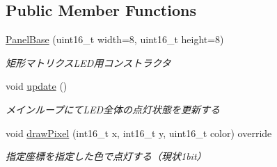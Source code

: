\subsection*{Public Member Functions}
\begin{DoxyCompactItemize}
\item 
\mbox{\label{classPanelBase_ae67aa479a006ead3f7ab01c6ce41e26b}} 
\hyperlink{classPanelBase_ae67aa479a006ead3f7ab01c6ce41e26b}{Panel\+Base} (uint16\+\_\+t width=8, uint16\+\_\+t height=8)
\begin{DoxyCompactList}\small\item\em 矩形マトリクス\+L\+E\+D用コンストラクタ \end{DoxyCompactList}\item 
\mbox{\label{classPanelBase_aece79bece96754da41945381d63a08fb}} 
void \hyperlink{classPanelBase_aece79bece96754da41945381d63a08fb}{update} ()
\begin{DoxyCompactList}\small\item\em メインループにて\+L\+E\+D全体の点灯状態を更新する \end{DoxyCompactList}\item 
\mbox{\label{classPanelBase_a45f3a84f68861b3ae1bb34056bfd0d12}} 
void \hyperlink{classPanelBase_a45f3a84f68861b3ae1bb34056bfd0d12}{draw\+Pixel} (int16\+\_\+t x, int16\+\_\+t y, uint16\+\_\+t color) override
\begin{DoxyCompactList}\small\item\em 指定座標を指定した色で点灯する（現状1bit） \end{DoxyCompactList}\end{DoxyCompactItemize}
